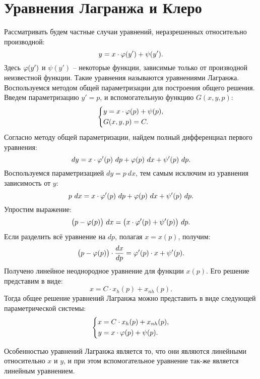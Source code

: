 \section{Уравнения Лагранжа и Клеро}

	Рассматривать будем частные случаи уравнений, неразрешенных относительно производной:
	\[ y = x \cdot \varphi(y') + \psi(y'). \]
	Здесь $\varphi(y')$ и $\psi(y')$ -- некоторые функции, зависимые только от производной неизвестной функции. Такие уравнения называются уравнениями Лагранжа. Воспользуемся методом общей параметризации для построения общего решения. Введем параметризацию $y' = p$, и вспомогательную функцию $G(x, y, p)$:
	\[ \left\lbrace \begin{split}
		&y = x \cdot \varphi(p) + \psi(p), \\
		&G(x, y, p) = C.
	\end{split} \right. \]
	Согласно методу общей параметризации, найдем полный дифференциал первого уравнения:
	\[ dy = x \cdot \varphi'(p) ~ dp + \varphi(p) ~ dx + \psi'(p) ~ dp. \]
	Воспользуемся параметризацией $dy = p ~ dx$, тем самым исключим из уравнения зависимость от $y$:
	\[ p ~ dx = x \cdot \varphi'(p) ~ dp + \varphi(p) ~ dx + \psi'(p) ~ dp. \]
	Упростим выражение:
	\[ \bigl( p - \varphi(p) \bigr) ~ dx = \bigl( x \cdot \varphi'(p) + \psi'(p) \bigr) ~ dp. \]
	Если разделить всё уравнение на $dp$, полагая $x = x(p)$, получим:
	\[ \bigl( p - \varphi(p) \bigr) \cdot \dfrac{d x}{d p} = \varphi'(p) \cdot x + \psi'(p). \]
	Получено линейное неоднородное уравнение для функции $x(p)$. Его решение представим в виде:
	\[ x = C \cdot x_h(p) + x_{nh}(p). \]
	Тогда общее решение уравнений Лагранжа можно представить в виде следующей параметрической системы:
	\[ \left\lbrace \begin{split} 
		x &= C \cdot x_{h}(p) + x_{nh}(p), \\ 
		y &= x \cdot \varphi(p) + \psi(p).
	\end{split} \right. \]

	Особенностью уравнений Лагранжа является то, что они являются линейными относительно $x$ и $y$, и при этом вспомогательное уравнение так-же является линейным уравнением.

